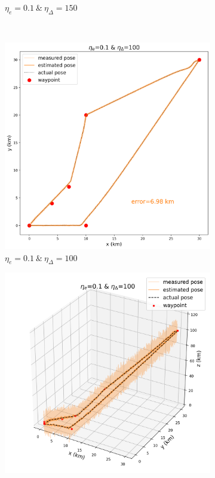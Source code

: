 \begin{figure}[]
\begin{subfigure}[t]{0.24\textwidth}
		\caption{$\eta_e=0.1\:\&\:\eta_\Delta=150$}
	\end{subfigure} \\
	\hfill
	\begin{subfigure}[t]{0.24\textwidth}
		\centering
		\includegraphics[width=\linewidth]{figures/lookahead_eta_01_100_2d.png}
		\caption{$\eta_e=0.1\:\&\:\eta_\Delta=100$}
	\end{subfigure} 
	\hfill
	\begin{subfigure}[t]{0.24\textwidth}
		\centering
		\includegraphics[width=\linewidth]{figures/lookahead_eta_01_100_3d.png}

\end{subfigure}
\end{figure}
